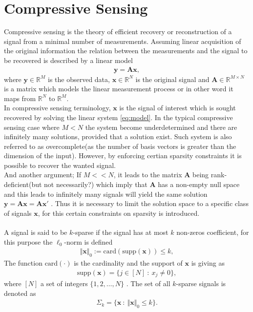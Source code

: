 \section{Compressive Sensing}\label{sec:CS}
Compressive sensing is the theory of efficient recovery or reconstruction of a signal from a minimal number of measurements. Assuming linear acquisition of the original information the relation between the measurements and the signal to be recovered is described by a linear model\cite{FR} 
\begin{align}\label{eq:model}
\mathbf{y} = \mathbf{Ax},
\end{align}
where $\mathbf{y} \in \mathbb{R}^M$ is the observed data, $\mathbf{x} \in \mathbb{R}^N$ is the original signal and $\mathbf{A} \in \mathbb{R}^{M \times N}$ is a matrix which models the linear measurement process or in other word it maps from $\mathbb{R}^{N}$ to $\mathbb{R}^{M}$.\\
In compressive sensing terminology, $\mathbf{x}$ is the signal of interest which is sought recovered by solving the linear system \eqref{eq:model}. In the typical compressive sensing case where $M<N$ the system become underdetermined and there are infinitely many solutions, provided that a solution exist. Such system is also referred to as overcomplete(as the number of basis vectors is greater than the dimension of the input). However, by enforcing certian sparsity constraints it is possible to recover the wanted signal\cite{FR}. \\ 
And another argument; If $M<<N$, it leads to the matrix $\mathbf{A}$ being rank-deficient(but not necessarily?) which imply that $\mathbf{A}$ has a non-empty null space and this leads to infinitely many signals will yield the same solution $\mathbf{y} = \mathbf{Ax} = \mathbf{Ax'}$ \cite[p. ix]{CS}. Thus it is necessary to limit the solution space to a specific class of signals $\mathbf{x}$, for this certain  constraints on sparsity is introduced.   
\\ \\
A signal is said to be $k$-sparse if the signal has at most $k$ non-zeros coefficient, for this purpose the $\ell_0$-norm is defined 
\begin{align*}
\Vert \mathbf{x} \Vert_0 := \text{card}(\text{supp}(\mathbf{x})) \leq k,
\end{align*}
The function $\text{card}(\cdot)$ is the cardinality and the support of $\mathbf{x}$ is giving as
\begin{align*}
\text{supp}(\mathbf{x}) = \{ j \in [N] \ : \ x_j \neq 0 \},
\end{align*} 
where $[N]$ a set of integers $\{1,2,\hdots,N\}$ \cite[p. 41]{FR}. The set of all $k$-sparse signals is denoted as
\begin{align*}
\Sigma_k = \{ \mathbf{x} \ : \ \Vert \mathbf{x} \Vert_0 \leq k \}.
\end{align*}

